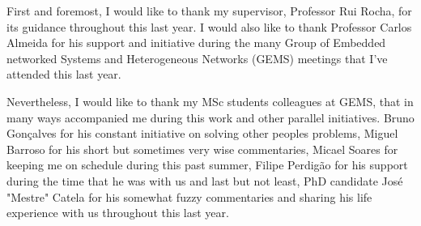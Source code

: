\begin{acknowledgments}
First and foremost, I would like to thank my supervisor, Professor Rui Rocha, for its guidance throughout this last year. I would also like to thank Professor Carlos Almeida for his support and initiative during the many Group of Embedded networked Systems and Heterogeneous Networks (GEMS) meetings that I've attended this last year.

Nevertheless, I would like to thank my MSc students colleagues at GEMS, that in many ways accompanied me during this work and other parallel initiatives. Bruno Gonçalves for his constant initiative on solving other peoples problems, Miguel Barroso for his short but sometimes very wise commentaries, Micael Soares for keeping me on schedule during this past summer, Filipe Perdigão for his support during the time that he was with us and last but not least, PhD candidate José "Mestre" Catela for his somewhat fuzzy commentaries and sharing his life experience with us throughout this last year.
\end{acknowledgments}